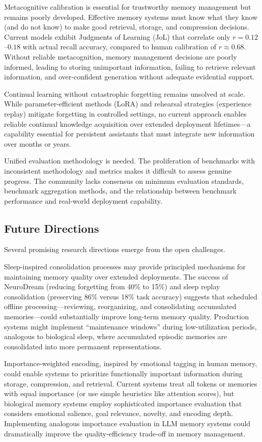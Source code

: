\documentclass[11pt,letterpaper]{article}
\begin{document}
Metacognitive calibration is essential for trustworthy memory management but remains poorly developed. Effective memory systems must know what they know (and do not know) to make good retrieval, storage, and compression decisions. Current models exhibit Judgments of Learning (JoL) that correlate only $r = 0.12$--$0.18$ with actual recall accuracy, compared to human calibration of $r \approx 0.68$. Without reliable metacognition, memory management decisions are poorly informed, leading to storing unimportant information, failing to retrieve relevant information, and over-confident generation without adequate evidential support.

Continual learning without catastrophic forgetting remains unsolved at scale. While parameter-efficient methods (LoRA) and rehearsal strategies (experience replay) mitigate forgetting in controlled settings, no current approach enables reliable continual knowledge acquisition over extended deployment lifetimes---a capability essential for persistent assistants that must integrate new information over months or years.

Unified evaluation methodology is needed. The proliferation of benchmarks with inconsistent methodology and metrics makes it difficult to assess genuine progress. The community lacks consensus on minimum evaluation standards, benchmark aggregation methods, and the relationship between benchmark performance and real-world deployment capability.

\subsection{Future Directions}

Several promising research directions emerge from the open challenges.

Sleep-inspired consolidation processes may provide principled mechanisms for maintaining memory quality over extended deployments. The success of NeuroDream (reducing forgetting from 40\% to 15\%) and sleep replay consolidation (preserving 86\% versus 18\% task accuracy) suggests that scheduled offline processing---reviewing, reorganizing, and consolidating accumulated memories---could substantially improve long-term memory quality. Production systems might implement ``maintenance windows'' during low-utilization periods, analogous to biological sleep, where accumulated episodic memories are consolidated into more permanent representations.

Importance-weighted encoding, inspired by emotional tagging in human memory, could enable systems to prioritize functionally important information during storage, compression, and retrieval. Current systems treat all tokens or memories with equal importance (or use simple heuristics like attention scores), but biological memory systems employ sophisticated importance evaluation that considers emotional salience, goal relevance, novelty, and encoding depth. Implementing analogous importance evaluation in LLM memory systems could dramatically improve the quality-efficiency trade-off in memory management.
\end{document}
